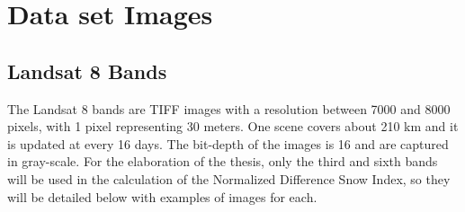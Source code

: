 \documentclass[12pt, a4paper]{report}
\begin{document}
	\section{Data set Images}
	\subsection{Landsat 8 Bands}
	The Landsat 8 bands are TIFF images with a resolution between 7000 and 8000 pixels, with 1 pixel representing 30 meters. One scene covers about 210 km and it is updated at every 16 days. The bit-depth of the images is 16 and are captured in gray-scale. For the elaboration of the thesis, only the third and sixth bands will be used in the calculation of the Normalized Difference Snow Index, so they will be detailed below with examples of images for each.
\end{document}
